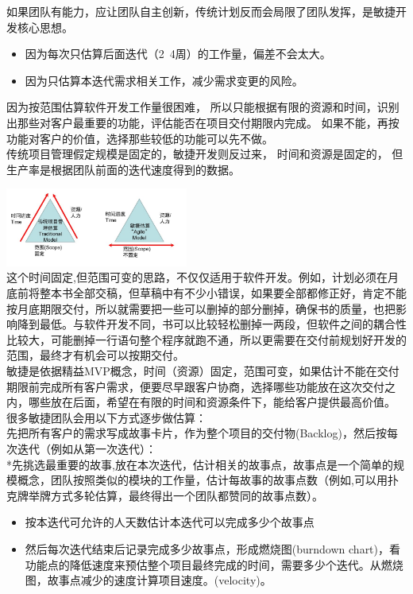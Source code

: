 如果团队有能力，应让团队自主创新，传统计划反而会局限了团队发挥，是敏捷开发核心思想。

\begin{itemize}
\tightlist
\item
  因为每次只估算后面迭代（2~4周）的工作量，偏差不会太大。
\item
  因为只估算本迭代需求相关工作，减少需求变更的风险。
\end{itemize}

因为按范围估算软件开发工作量很困难，
所以只能根据有限的资源和时间，识别出那些对客户最重要的功能，评估能否在项目交付期限内完成。
如果不能，再按功能对客户的价值，选择那些较低的功能可以先不做。\\
传统项目管理假定规模是固定的，敏捷开发则反过来， 时间和资源是固定的，
但生产率是根据团队前面的迭代速度得到的数据。


\includegraphics[width=6cm]{微信图片_20230105131327.jpg}\\

这个时间固定,但范围可变的思路，不仅仅适用于软件开发。例如，计划必须在月底前将整本书全部交稿，但草稿中有不少小错误，如果要全部都修正好，肯定不能按月底期限交付，所以就需要把一些可以删掉的部分删掉，确保书的质量，也把影响降到最低。与软件开发不同，书可以比较轻松删掉一两段，但软件之间的耦合性比较大，可能删掉一行语句整个程序就跑不通，所以更需要在交付前规划好开发的范围，最终才有机会可以按期交付。\\
敏捷是依据精益MVP概念，时间（资源）固定，范围可变，如果估计不能在交付期限前完成所有客户需求，便要尽早跟客户协商，选择哪些功能放在这次交付之内，哪些放在后面，希望在有限的时间和资源条件下，能给客户提供最高价值。
很多敏捷团队会用以下方式逐步做估算：\\
先把所有客户的需求写成故事卡片，作为整个项目的交付物(Backlog)，然后按每次迭代（例如从第一次迭代）：\\
*先挑选最重要的故事,放在本次迭代，估计相关的故事点，故事点是一个简单的规模概念，团队按照类似的模块的工作量，估计每故事的故事点数（例如,可以用扑克牌举牌方式多轮估算，最终得出一个团队都赞同的故事点数）。

\begin{itemize}
\tightlist
\item
  按本迭代可允许的人天数估计本迭代可以完成多少个故事点
\item
  然后每次迭代结束后记录完成多少故事点，形成燃烧图(burndown
  chart)，看功能点的降低速度来预估整个项目最终完成的时间，需要多少个迭代。从燃烧图，故事点减少的速度计算项目速度。(velocity)。
\end{itemize}

